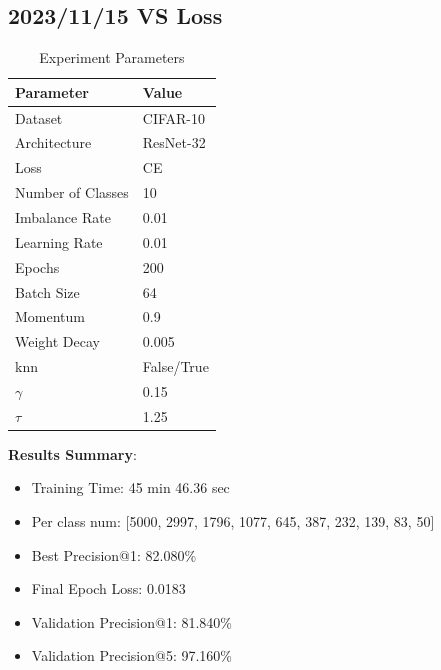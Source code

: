 \documentclass{article}
\begin{document}
\begin{multicols}{2} %
\section{2023/11/15 VS Loss}
\begin{table}[H]
\centering
\caption{Experiment Parameters}
\label{tab:parameters_vs}
\begin{tabular}{ll}
\toprule
Parameter & Value \\
\midrule
Dataset & CIFAR-10 \\
Architecture & ResNet-32 \\
Loss & CE \\
Number of Classes & 10 \\
Imbalance Rate & 0.01 \\
Learning Rate & 0.01 \\
Epochs & 200 \\
Batch Size & 64 \\
Momentum & 0.9 \\
Weight Decay & 0.005 \\
knn & False/True \\
\(\gamma\) & 0.15 \\
\(\tau\) & 1.25 \\
\bottomrule
\end{tabular}
\end{table}

\textbf{Results Summary}:
\begin{itemize}
    \item Training Time: 45 min 46.36 sec
    \item Per class num: [5000, 2997, 1796, 1077, 645, 387, 232, 139, 83, 50]
    \item Best Precision@1: 82.080\%
    \item Final Epoch Loss: 0.0183
    \item Validation Precision@1: 81.840\%
    \item Validation Precision@5: 97.160\%
\end{itemize}


\end{multicols}
\end{document}
